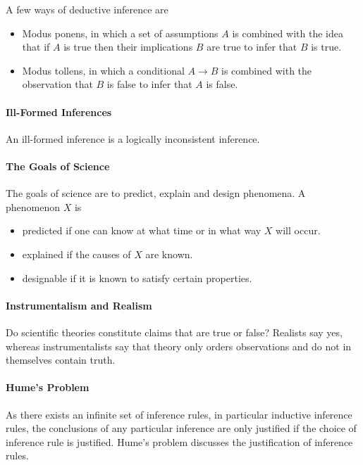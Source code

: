 A few ways of deductive inference are
\begin{itemize}
	\item Modus ponens, in which a set of assumptions $A$ is combined with the idea that if $A$ is true then their implications $B$ are true to infer that $B$ is true.
	\item Modus tollens, in which a conditional $A\to B$ is combined with the observation that $B$ is false to infer that $A$ is false. 
\end{itemize}

\paragraph{Ill-Formed Inferences}
An ill-formed inference is a logically inconsistent inference.

\paragraph{The Goals of Science}
The goals of science are to predict, explain and design phenomena. A phenomenon $X$ is
\begin{itemize}
	\item predicted if one can know at what time or in what way $X$ will occur.
	\item explained if the causes of $X$ are known.
	\item designable if it is known to satisfy certain properties.
\end{itemize}

\paragraph{Instrumentalism and Realism}
Do scientific theories constitute claims that are true or false? Realists say yes, whereas instrumentalists say that theory only orders observations and do not in themselves contain truth.

\paragraph{Hume's Problem}
As there exists an infinite set of inference rules, in particular inductive inference rules, the conclusions of any particular inference are only justified if the choice of inference rule is justified. Hume's problem discusses the justification of inference rules.

